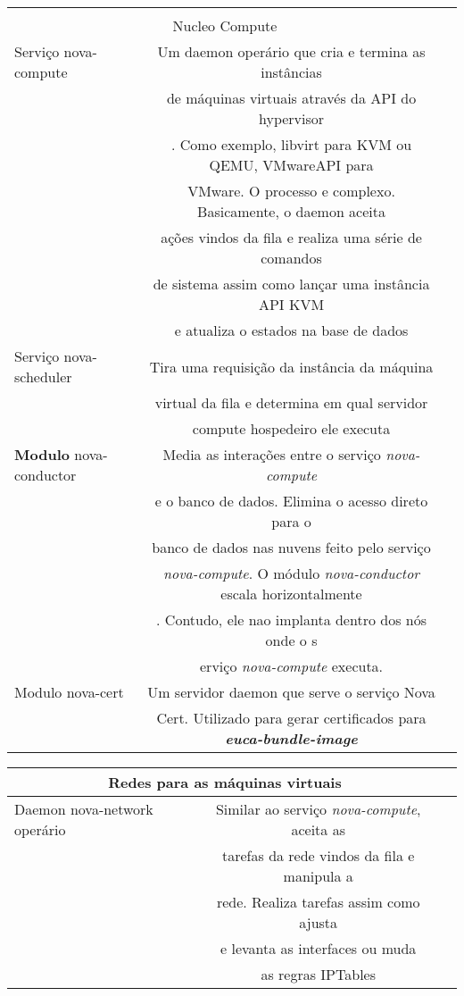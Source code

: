 \begin{tabular}{|l||c|c|}
	\hline \\
	\multicolumn{2}{c}{Nucleo Compute} \\
	\hline \hline
	Serviço nova-compute& Um daemon operário que cria e termina as instâncias\\& de máquinas virtuais através da API do hypervisor\\&. Como exemplo, libvirt para KVM ou QEMU, VMwareAPI para\\& VMware. O processo e complexo. Basicamente, o daemon aceita\\& ações vindos da fila e realiza uma série de comandos\\& de sistema assim como lançar uma instância API KVM\\& e atualiza o estados na base de dados \\
	\hline \hline
	
	Serviço nova-scheduler& Tira uma requisição da instância da máquina\\& virtual da fila e determina em qual servidor\\& compute hospedeiro ele executa \\
	\hline \hline
	
	\textbf{Modulo} nova-conductor& Media as interações entre o serviço \emph{nova-compute}\\& e o banco de dados. Elimina o acesso direto para o\\& banco de dados nas nuvens feito pelo serviço\\& \emph{nova-compute}. O módulo \emph{nova-conductor} escala horizontalmente\\&. Contudo, ele nao implanta dentro dos nós onde o s\\&erviço \emph{nova-compute} executa. \\
	\hline \hline
	
	Modulo nova-cert& Um servidor daemon que serve o serviço Nova\\& Cert. Utilizado para gerar certificados para \emph{\textbf{euca-bundle-image}} \\
	\hline
\end{tabular}

\begin{tabular}{|l||c|c|}
\hline
\multicolumn{2}{|c|}{Redes para as máquinas virtuais} \\
\hline \hline
Daemon nova-network operário& Similar ao serviço \emph{nova-compute}, aceita as\\& tarefas da rede vindos da fila e manipula a \\&rede. Realiza tarefas assim como ajusta\\& e levanta as interfaces ou muda\\& as regras IPTables \\
\hline
\end{tabular}

